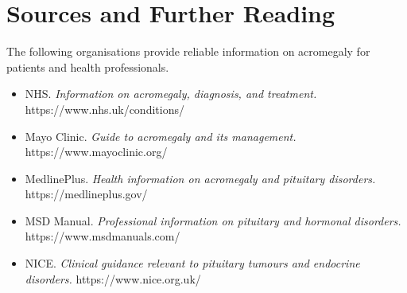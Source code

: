 \section*{Sources and Further Reading}
The following organisations provide reliable information on acromegaly for patients and health professionals.

\begin{itemize}
    \item NHS. \textit{Information on acromegaly, diagnosis, and treatment.} https://www.nhs.uk/conditions/
    \item Mayo Clinic. \textit{Guide to acromegaly and its management.} https://www.mayoclinic.org/
    \item MedlinePlus. \textit{Health information on acromegaly and pituitary disorders.} https://medlineplus.gov/
    \item MSD Manual. \textit{Professional information on pituitary and hormonal disorders.} https://www.msdmanuals.com/
    \item NICE. \textit{Clinical guidance relevant to pituitary tumours and endocrine disorders.} https://www.nice.org.uk/
\end{itemize}
